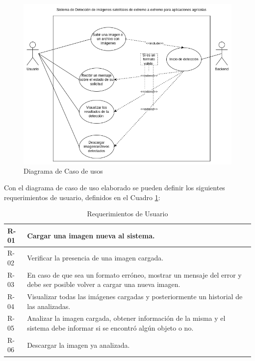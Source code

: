 \begin{figure}[h!]
    \centering
    \includegraphics[width=1\textwidth]{img/Diagrama de Casos de usos.drawio (1).png}
    \caption{Diagrama de Caso de usos}
    \label{fig:diagrama-casos-de-uso}
\end{figure}

Con el diagrama de caso de uso elaborado se pueden definir los siguientes requerimientos de usuario, definidos en el Cuadro \ref{requser}:

\begin{table}[h!]
    \begin{tabular}{ | p{1cm} |p{11cm}| }
        \hline
        \rowcolor[HTML]{d6d8ff}
        R-01 & Cargar una imagen nueva al sistema.\\
        \hline
        R-02 & Verificar la presencia de una imagen cargada.\\
        \hline
        \rowcolor[HTML]{d6d8ff}
        R-03 & En caso de que sea un formato erróneo, mostrar un mensaje del error y debe ser posible volver a cargar una nueva imagen.\\
        \hline
        R-04 & Visualizar todas las imágenes cargadas y posteriormente un historial de las analizadas.\\
        \hline
        \rowcolor[HTML]{d6d8ff}
        R-05 & Analizar la imagen cargada, obtener información de la misma y el sistema debe informar si se encontró algún objeto o no.\\
        \hline
        R-06 & Descargar la imagen ya analizada.\\
        \hline
    \end{tabular}
    \caption{Requerimientos de Usuario}
    \label{requser}
\end{table}


